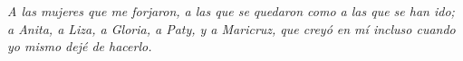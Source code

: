 \chapter*{}
\setcounter{page}{4}
\begin{flushright}
\textit{A las mujeres que me forjaron, a las que se quedaron como a las que se han ido; a Anita, a Liza, a Gloria, a Paty, y a Maricruz, que creyó en mí incluso cuando yo mismo dejé de hacerlo.}
\end{flushright}


